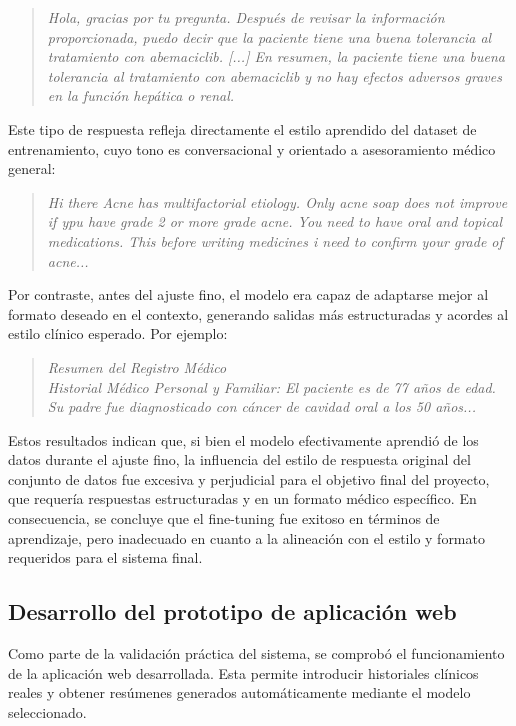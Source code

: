 \documentclass[../main.tex]{subfiles}
\begin{document}
\begin{quote}
	\textit{Hola, gracias por tu pregunta. Después de revisar la información proporcionada, puedo decir que la paciente tiene una buena tolerancia al tratamiento con abemaciclib. [...] En resumen, la paciente tiene una buena tolerancia al tratamiento con abemaciclib y no hay efectos adversos graves en la función hepática o renal.}
\end{quote}

Este tipo de respuesta refleja directamente el estilo aprendido del dataset de entrenamiento, cuyo tono es conversacional y orientado a asesoramiento médico general:

\begin{quote}
	\textit{Hi there Acne has multifactorial etiology. Only acne soap does not improve if ypu have grade 2 or more grade acne. You need to have oral and topical medications. This before writing medicines i need to confirm your grade of acne...}
\end{quote}

Por contraste, antes del ajuste fino, el modelo era capaz de adaptarse mejor al formato deseado en el contexto, generando salidas más estructuradas y acordes al estilo clínico esperado. Por ejemplo:

\begin{quote}
	\textit{Resumen del Registro Médico} \\
	\textit{Historial Médico Personal y Familiar: El paciente es de 77 años de edad. Su padre fue diagnosticado con cáncer de cavidad oral a los 50 años...}
	


\end{quote}

Estos resultados indican que, si bien el modelo efectivamente aprendió de los datos durante el ajuste fino, la influencia del estilo de respuesta original del conjunto de datos fue excesiva y perjudicial para el objetivo final del proyecto, que requería respuestas estructuradas y en un formato médico específico. En consecuencia, se concluye que el fine-tuning fue exitoso en términos de aprendizaje, pero inadecuado en cuanto a la alineación con el estilo y formato requeridos para el sistema final.


\subsection{Desarrollo del prototipo de aplicación web}

Como parte de la validación práctica del sistema, se comprobó el funcionamiento de la aplicación web desarrollada. Esta permite introducir historiales clínicos reales y obtener resúmenes generados automáticamente mediante el modelo seleccionado.
\end{document}
